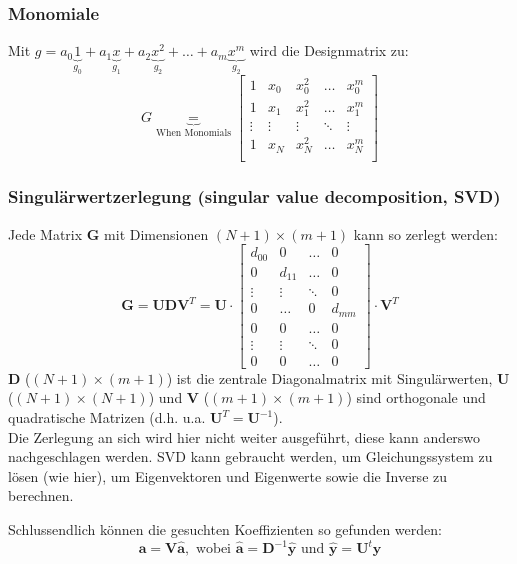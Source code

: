 \subsubsection{Monomiale}
Mit 
$g = a_0 \underbrace{1}_{g_0} + a_1 \underbrace{x}_{g_1} + a_2 \underbrace{x^2}_{g_2} +\ldots + a_m \underbrace{x^m}_{g_2}$ 
wird die Designmatrix zu:
$$G \underbrace{=}_{\text{When Monomials}} 
\begin{bmatrix}
  1 & x_0 & x_0^2  & \ldots & x_0^m\\
  1 & x_1 & x_1^2  & \ldots & x_1^m\\
  \vdots  & \vdots & \vdots  & \ddots & \vdots\\
  1 & x_N & x_N^2  & \ldots & x_N^m\\
\end{bmatrix}$$

\subsubsection{Singulärwertzerlegung (singular value decomposition, SVD)}
Jede Matrix $\bm G$ mit Dimensionen $(N+1) \times (m+1)$ kann so zerlegt werden:
$$\bm G = \bm U \bm D \bm V^T = \bm U \cdot \begin{bmatrix}
  d_{00} & 0      & \ldots & 0\\
  0      & d_{11} & \ldots & 0\\
  \vdots & \vdots & \ddots & 0\\
  0      & \ldots & 0      & d_{mm}\\
  0      & 0      & \ldots & 0\\
  \vdots & \vdots & \ddots & 0\\
  0      & 0      & \ldots & 0
\end{bmatrix} \cdot \bm V^T$$
$\bm D$ ($(N+1) \times (m+1)$) ist die zentrale Diagonalmatrix mit Singulärwerten,
$\bm U$ ($(N+1) \times (N+1)$) und $\bm V$ ($(m+1) \times (m+1)$) sind orthogonale und quadratische
Matrizen (d.h. u.a. $\bm U^T=\bm U^{-1}$).\\


Die Zerlegung an sich wird hier nicht weiter ausgeführt, diese kann anderswo nachgeschlagen werden.
SVD kann gebraucht werden, um Gleichungssystem zu lösen (wie hier), um Eigenvektoren und Eigenwerte 
sowie die Inverse zu berechnen.

Schlussendlich können die gesuchten Koeffizienten so gefunden werden: 
$$\bm a = \bm V \hat{\bm a},\text{ wobei } \hat{\bm a} = \bm D^{-1} \hat{\bm{ y}}\text{ und } \hat{\bm y} = \bm U^t \bm y$$

